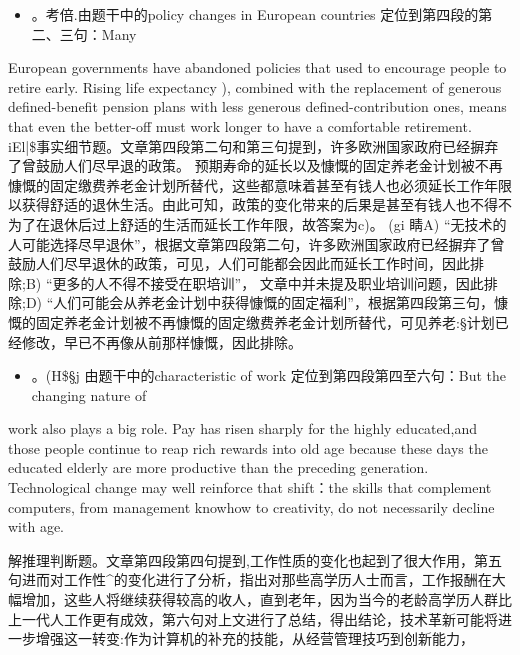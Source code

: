 \documentclass[UTF8,11pt]{ctexart}
\begin{document}
\begin{itemize}[leftmargin=2em,itemsep=.2em,topsep=.4em]\item[C.] 。考倍.由题干中的policy changes in European countries 定位到第四段的第二、三句：Many
\end{itemize}

European governments have abandoned policies that used to encourage people to retire early. Rising life expectancy ), combined with the replacement of generous defined-benefit pension plans with less generous defined-contribution ones, means that even the better-off must work longer to have a comfortable retirement. iEl|\$事实细节题。文章第四段第二句和第三句提到，许多欧洲国家政府已经摒弃了曾鼓励人们尽早退的政策。 预期寿命的延长以及慷慨的固定养老金计划被不再慷慨的固定缴费养老金计划所替代，这些都意味着甚至有钱人也必须延长工作年限以获得舒适的退休生活。由此可知，政策的变化带来的后果是甚至有钱人也不得不为了在退休后过上舒适的生活而延长工作年限，故答案为c)。 (gi 睛A) “无技术的人可能选择尽早退休”，根据文章第四段第二句，许多欧洲国家政府已经摒弃了曾鼓励人们尽早退休的政策，可见，人们可能都会因此而延长工作时间，因此排除;B) “更多的人不得不接受在职培训”， 文章中并未提及职业培训问题，因此排除;D) “人们可能会从养老金计划中获得慷慨的固定福利”，根据第四段第三句，慷慨的固定养老金计划被不再慷慨的固定缴费养老金计划所替代，可见养老:§计划已经修改，早已不再像从前那样慷慨，因此排除。


\begin{itemize}[leftmargin=2em,itemsep=.2em,topsep=.4em]\item[D.] 。(H\$§j 由题干中的characteristic of work 定位到第四段第四至六句：But the changing nature of
\end{itemize}

work also plays a big role. Pay has risen sharply for the highly educated,and those people continue to reap rich rewards into old age because these days the educated elderly are more productive than the preceding generation. Technological change may well reinforce that shift：the skills that complement computers, from management knowhow to creativity, do not necessarily decline with age.


解推理判断题。文章第四段第四句提到,工作性质的变化也起到了很大作用，第五句进而对工作性\textasciicircum{}的变化进行了分析，指出对那些高学历人士而言，工作报酬在大幅增加，这些人将继续获得较高的收人，直到老年，因为当今的老龄高学历人群比上一代人工作更有成效，第六句对上文进行了总结，得出结论，技术革新可能将进一步增强这一转变:作为计算机的补充的技能，从经营管理技巧到创新能力，
\end{document}
